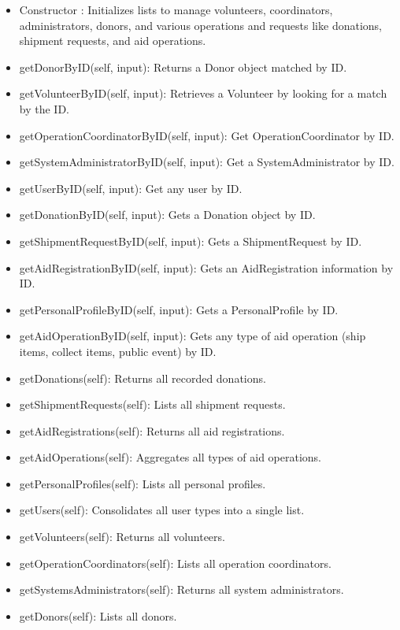 \documentclass[a4paper,12pt]{report}
\begin{document}
			
			\begin{itemize}
				\item	Constructor : Initializes lists to manage volunteers, coordinators, administrators, donors, and various operations and requests like donations, shipment requests, and aid operations.
				
				\item	getDonorByID(self, input): Returns a Donor object matched by ID.
				\item	getVolunteerByID(self, input): Retrieves a Volunteer by looking for a match by the ID.
				\item	getOperationCoordinatorByID(self, input): Get  OperationCoordinator by ID.
				\item	getSystemAdministratorByID(self, input): Get a SystemAdministrator by ID.
				\item	getUserByID(self, input): Get any user  by ID.
				\item	getDonationByID(self, input): Gets a Donation object by ID.
				\item	getShipmentRequestByID(self, input): Gets a ShipmentRequest by ID.
				\item	getAidRegistrationByID(self, input): Gets an AidRegistration information by ID.
				\item	getPersonalProfileByID(self, input): Gets a PersonalProfile by ID.
				\item	getAidOperationByID(self, input): Gets any type of aid operation (ship items, collect items, public event) by ID.
				
				\item	getDonations(self): Returns all recorded donations.
				\item	getShipmentRequests(self): Lists all shipment requests.
				\item	getAidRegistrations(self): Returns all aid registrations.
				\item	getAidOperations(self): Aggregates all types of aid operations.
				\item	getPersonalProfiles(self): Lists all personal profiles.
				\item	getUsers(self): Consolidates all user types into a single list.
				\item	getVolunteers(self): Returns all volunteers.
				\item	getOperationCoordinators(self): Lists all operation coordinators.
				\item	getSystemsAdministrators(self): Returns all system administrators.
				\item	getDonors(self): Lists all donors.
			

\end{itemize}
\end{document}
